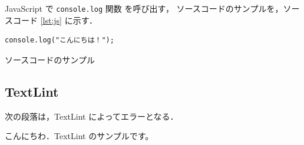 \documentclass[a4paper, 12pt, uplatex]{jsarticle}
\begin{document}
JavaScript で \texttt{console.log} 関数 \cite{consolel20:online} を呼び出す，
ソースコードのサンプルを，ソースコード \ref{lst:js} に示す．


\begin{listing}[ht]
  \begin{verbatim}
console.log("こんにちは！");
  \end{verbatim}
  \caption{ソースコードのサンプル}
  \label{lst:js}
\end{listing}

\subsection{TextLint}

次の段落は，TextLint によってエラーとなる．

こんにちわ．TextLint のサンプルです。




\end{document}
